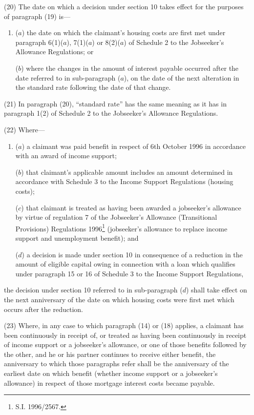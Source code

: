 \documentclass[12pt,a4paper]{article}
\begin{document}
(20) The date on which a decision under section 10 takes effect for the purposes of paragraph (19) is—
\begin{enumerate}\item[]
($a$) the date on which the claimant’s housing costs are first met under paragraph 6(1)($a$), 7(1)($a$) or 8(2)($a$) of Schedule 2 to the Jobseeker’s Allowance Regulations; or

($b$) where the changes in the amount of interest payable occurred after the date referred to in sub-paragraph ($a$), on the date of the next alteration in the standard rate following the date of that change.
\end{enumerate}

(21) In paragraph (20), “standard rate” has the same meaning as it has in paragraph 1(2) of Schedule 2 to the Jobseeker’s Allowance Regulations.

(22) Where—
\begin{enumerate}\item[]
($a$) a claimant was paid benefit in respect of 6th October 1996 in accordance with an award of income support;

($b$) that claimant’s applicable amount includes an amount determined in accordance with Schedule 3 to the Income Support Regulations (housing costs);

($c$) that claimant is treated as having been awarded a jobseeker’s allowance by virtue of regulation 7 of the Jobseeker’s Allowance (Transitional Provisions) Regulations 1996\footnote{\frenchspacing S.I. 1996/2567.} (jobseeker’s allowance to replace income support and unemployment benefit); and

($d$) a decision is made under section 10 in consequence of a reduction in the amount of eligible capital owing in connection with a loan which qualifies under paragraph 15 or 16 of Schedule 3 to the Income Support Regulations,
\end{enumerate}
the decision under section 10 referred to in sub-paragraph ($d$) shall take effect on the next anniversary of the date on which housing costs were first met which occurs after the reduction.

(23) Where, in any case to which paragraph (14) or (18) applies, a claimant has been continuously in receipt of, or treated as having been continuously in receipt of income support or a jobseeker’s allowance, or one of those benefits followed by the other, and he or his partner continues to receive either benefit, the anniversary to which those paragraphs refer shall be the anniversary of the earliest date on which benefit (whether income support or a jobseeker’s allowance) in respect of those mortgage interest costs became payable.
\end{document}
